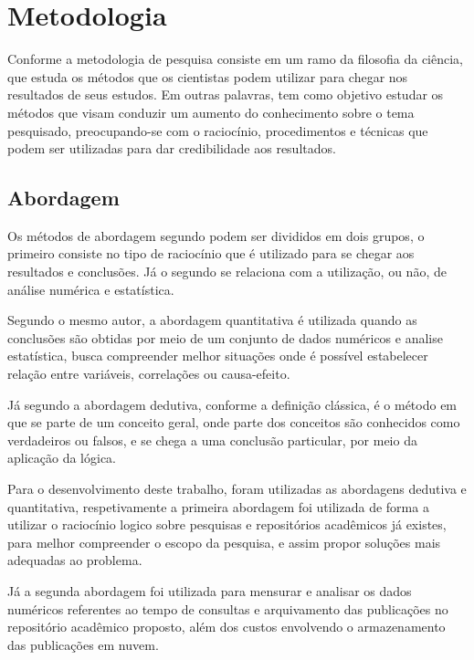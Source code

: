 \section{Metodologia} \label{sec:Methodology}

Conforme \citep[p. 15]{LOVATO:metodologia} a metodologia de pesquisa
consiste em um ramo da filosofia da ciência, que estuda os métodos que
os cientistas podem utilizar para chegar nos resultados de seus estudos.
Em outras palavras, tem como objetivo estudar os métodos que visam
conduzir um aumento do conhecimento sobre o tema pesquisado, preocupando-se
com o raciocínio, procedimentos e técnicas que podem ser utilizadas para
dar credibilidade aos resultados.

\subsection{Abordagem}

Os métodos de abordagem segundo \citep[p. 29]{LOVATO:metodologia} podem ser
divididos em dois grupos, o primeiro consiste no tipo de raciocínio que
é utilizado para se chegar aos resultados e conclusões. Já o segundo
se relaciona com a utilização, ou não, de análise numérica e estatística.

Segundo o mesmo autor, a abordagem quantitativa é utilizada quando
as conclusões são obtidas por meio de um conjunto de dados numéricos
e analise estatística, busca compreender melhor situações onde é possível
estabelecer relação entre variáveis, correlações ou causa-efeito.

Já segundo \cite{GIL:metodologia} a abordagem dedutiva, conforme a definição clássica,
é o método em que se parte de um conceito geral, onde parte dos
conceitos são conhecidos como verdadeiros ou falsos, e se chega
a uma conclusão particular, por meio da aplicação da lógica.

Para o desenvolvimento deste trabalho, foram utilizadas as abordagens
dedutiva e quantitativa, respetivamente a primeira abordagem foi utilizada
de forma a utilizar o raciocínio logico sobre pesquisas e repositórios
acadêmicos já existes, para melhor compreender o escopo da pesquisa,
e assim propor soluções mais adequadas ao problema.

Já a segunda abordagem foi utilizada para mensurar e analisar
os dados numéricos referentes ao tempo de consultas e arquivamento
das publicações no repositório acadêmico proposto, além dos
custos envolvendo o armazenamento das publicações em nuvem.

